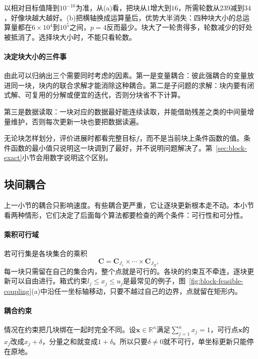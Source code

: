 以相对目标值降到$10^{-10}$为准，从(a)看，把块从$1$增大到$16$，所需轮数从$239$减到$34$，好像块越大越好。(b)把横轴换成运算量后，优势大半消失：四种块大小的总运算量都在$6\times10^4$到$10^5$之间，$p=4$反而最少。块大了一轮贵得多，轮数减少的好处被抵消了。选择块大小时，不能只看轮数。

\paragraph{决定块大小的三件事}
由此可以归纳出三个需要同时考虑的因素。第一是变量耦合：彼此强耦合的变量放进同一块，块内的联合求解才能消除这种耦合。第二是子问题的求解：块内要有闭式解、可复用的分解或便宜的迭代，否则分块省不下计算。

第三是数据读取：一块对应的数据最好能连续读取，并能借助残差之类的中间量增量维护，否则每次更新一块也要把数据读遍。

无论块怎样划分，评价进展时都看完整目标$f$，而不是当前块上条件函数的值。条件函数的最小值只说明这一块调到了最好，并不说明问题解决了。第~\ref{sec:block-exact}小节会用数字说明这个区别。

\subsection{块间耦合}
\label{sec:block-coupling}

上一小节的耦合只影响速度。有些耦合更严重，它让逐块更新根本走不动。本小节看两种情形，它们决定了后面每个算法都要检查的两个条件：可行性和可分性。

\paragraph{乘积可行域}
若可行集是各块集合的乘积
\begin{equation}
 \bm{C}=\bm{C}_{J_1}\times\cdots\times\bm{C}_{J_B},
 \label{eq:block-product-set}
\end{equation}
每一块只需留在自己的集合内，整个点就是可行的。各块的约束互不牵连，逐块更新可以自由进行。箱式约束$l_j\leq x_j\leq u_j$是最常见的例子，图~\ref{fig:block-feasible-coupling}(a)中沿任一坐标轴移动，只要不越过自己的边界，点就留在矩形内。

\paragraph{耦合约束}
情况在约束把几块绑在一起时完全不同。设$\bm{x}\in\mathbb{R}^n$满足$\sum_{j=1}^nx_j=1$，可行点$\bm{x}$的$x_j$改成$x_j+\delta$，分量之和就变成$1+\delta$。所以只要$\delta\neq0$就不可行，单坐标更新只能停在原地。


